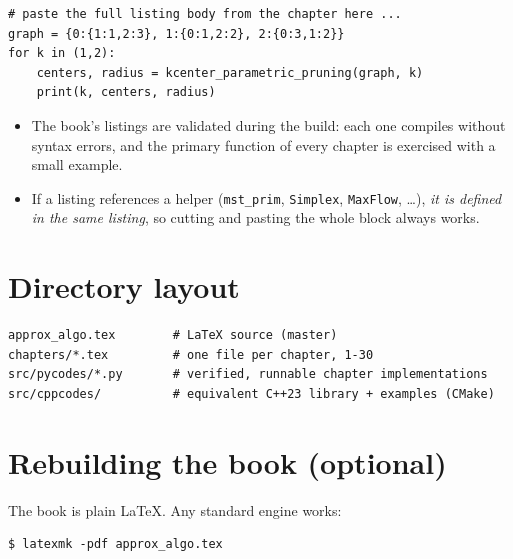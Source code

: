 \begin{lstlisting}[style=python, caption=Run a standalone chapter listing]
# paste the full listing body from the chapter here ...
graph = {0:{1:1,2:3}, 1:{0:1,2:2}, 2:{0:3,1:2}}
for k in (1,2):
    centers, radius = kcenter_parametric_pruning(graph, k)
    print(k, centers, radius)
\end{lstlisting}

\begin{itemize}
  \item The book's listings are validated during the build: each one compiles
        without syntax errors, and the primary function of every chapter is
        exercised with a small example.
  \item If a listing references a helper (\texttt{mst\_prim}, \texttt{Simplex},
        \texttt{MaxFlow}, \dots), \emph{it is defined in the same listing}, so
        cutting and pasting the whole block always works.
\end{itemize}

\section{Directory layout}

\begin{lstlisting}[style=basic, caption=Where the code lives]
approx_algo.tex        # LaTeX source (master)
chapters/*.tex         # one file per chapter, 1-30
src/pycodes/*.py       # verified, runnable chapter implementations
src/cppcodes/          # equivalent C++23 library + examples (CMake)
\end{lstlisting}

\section{Rebuilding the book (optional)}

The book is plain \LaTeX{}.  Any standard engine works:

\begin{lstlisting}[style=basic, caption=Compile the book]
$ latexmk -pdf approx_algo.tex
\end{lstlisting}